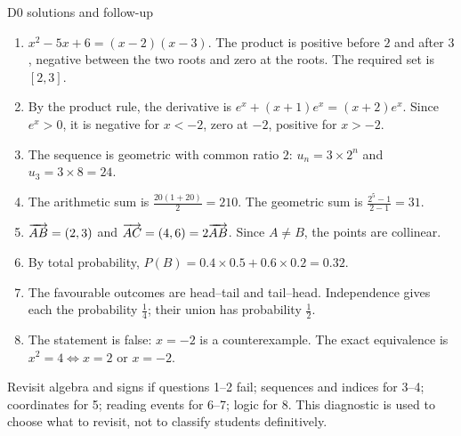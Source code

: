 \ifprof\begin{profbox}{D0 solutions and follow-up}
\begin{enumerate}
\item $x^2-5x+6=(x-2)(x-3)$. The product is positive before $2$ and after $3$, negative between the two roots and zero at the roots. The required set is $[2,3]$.
\item By the product rule, the derivative is $e^x+(x+1)e^x=(x+2)e^x$. Since $e^x>0$, it is negative for $x<-2$, zero at $-2$, positive for $x>-2$.
\item The sequence is geometric with common ratio $2$: $u_n=3\times2^n$ and $u_3=3\times8=24$.
\item The arithmetic sum is $\frac{20(1+20)}{2}=210$. The geometric sum is $\frac{2^5-1}{2-1}=31$.
\item $\overrightarrow{AB}=(2,3)$ and $\overrightarrow{AC}=(4,6)=2\overrightarrow{AB}$. Since $A\ne B$, the points are collinear.
\item By total probability, $P(B)=0.4\times0.5+0.6\times0.2=0.32$.
\item The favourable outcomes are head--tail and tail--head. Independence gives each the probability $\frac{1}{4}$; their union has probability $\frac{1}{2}$.
\item The statement is false: $x=-2$ is a counterexample. The exact equivalence is $x^2=4\Longleftrightarrow x=2\text{ or }x=-2$.
\end{enumerate}
Revisit algebra and signs if questions 1--2 fail; sequences and indices for 3--4; coordinates for 5; reading events for 6--7; logic for 8. This diagnostic is used to choose what to revisit, not to classify students definitively.
\end{profbox}\fi
\mainmatter


